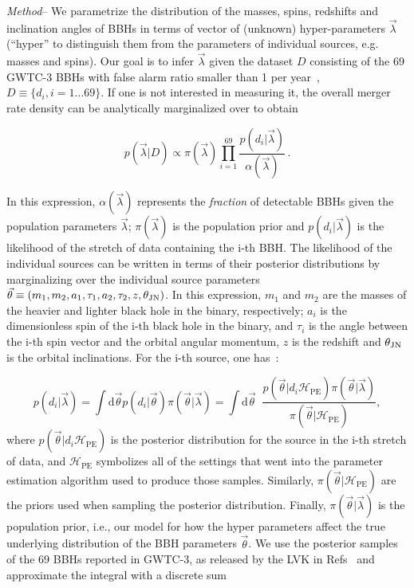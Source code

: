 \documentclass[floats,floatfix,showpacs,amssymb,prl,twocolumn,superscriptaddress,nofootinbib]{revtex4-2}
\newcommand{\beq}{\begin{equation}}
\newcommand{\eeq}{\end{equation}}
\newcommand\prlsec[1]{\vspace{2mm}\noindent \emph{#1}--}
\newcommand{\catalog}{GWTC-3\xspace}
\newcommand{\tjn}{\ensuremath{\theta_{\rm{JN}}}\xspace}
\newcommand{\nn}{\nonumber}
\newcommand{\vl}{\ensuremath{\vec{\lambda}}\xspace}
\newcommand{\vd}{\ensuremath{D}\xspace}
\newcommand{\vt}{\ensuremath{\vec{\theta}}\xspace}
\newcommand{\ud}{\ensuremath{\mathrm{d}}}
\newcommand{\maHP}{\ensuremath{\mathcal{H}_{\mathrm{PE}}}\xspace}
\begin{document}
\prlsec{Method} We parametrize the distribution of the masses, spins, redshifts and inclination angles of BBHs in terms of vector of (unknown) hyper-parameters \vl (``hyper'' to distinguish them from the parameters of individual sources, e.g. masses and spins). Our goal is to infer \vl given the dataset \vd consisting of the 69 \catalog BBHs with false alarm ratio smaller than 1 per year~\cite{LIGOScientific:2021psn}, $\vd \equiv  \{d_i, i=1\ldots 69\}$. If one is not interested in measuring it, the overall merger rate density can be analytically marginalized over to obtain~\cite{Mandel:2018mve,Fishbach:2018edt,Vitale:2020aaz}

\beq
p(\vl | \vd) \propto {\pi(\vl)}  \prod_{i=1}^{69} \frac{p(d_i |\vl) }{\alpha(\vl)}\,. \label{Eq.HyperPostOfLikeFirst} \nn
\eeq

In this expression, $\alpha(\vl)$ represents the \emph{fraction} of detectable BBHs given the population parameters \vl; $\pi(\vl)$ is the population prior and $p(d_i |\vl) $ is the likelihood of the stretch of data containing the i-th BBH. 
The likelihood of the individual sources can be written in terms of their posterior distributions by marginalizing over the individual source parameters $\vt\equiv (m_1, m_2, a_1, \tau_1, a_2, \tau_2,z, \tjn)$. In this expression, $m_1$ and $m_2$ are the masses of the heavier and lighter black hole in the binary, respectively;  $a_i$ is the dimensionless spin of the i-th black hole in the binary, and $\tau_i$ is the angle between the i-th spin vector and the orbital angular momentum, 
$z$ is the redshift and \tjn  is the orbital inclinations. For the i-th source, one has~\cite{2019PASA...36...10T,Vitale:2020aaz}:

\begin{equation}
p(d_i |\vl) =\int \ud \vt p(d_i |\vt ) \pi(\vt|\vl) =  \int \ud \vt\;\; \frac{  p(\vt | d_i \maHP)\pi(\vt|\vl) }{\pi(\vt|\maHP)},\nn
\end{equation}
where $p(\vt | d_i \maHP)$ is the posterior distribution for the source in the i-th stretch of data, and \maHP symbolizes all of the settings that went into the parameter estimation algorithm used to produce those samples. Similarly, $\pi(\vt|\maHP)$ are the priors used when sampling the posterior distribution. Finally, $\pi(\vt|\vl)$ is the population prior, i.e., our model for how the hyper parameters affect the true underlying distribution of the BBH parameters \vt. 
We use the posterior samples of the 69 BBHs reported in \catalog, as released by the LVK in Refs~\cite{GWTC1Release,GWTC2Release,ligo_scientific_collaboration_and_virgo_2021_5117703,ligo_scientific_collaboration_and_virgo_2021_5546663} and approximate the integral with a discrete sum 
\end{document}
